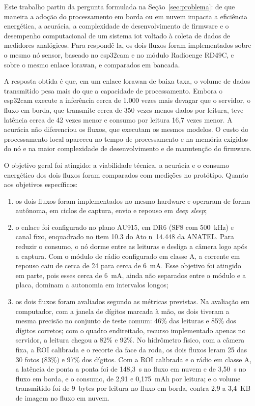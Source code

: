 Este trabalho partiu da pergunta formulada na Seção~\ref{sec:problema}: de que maneira a
adoção do processamento em borda ou em nuvem impacta a eficiência energética, a acurácia, a
complexidade de desenvolvimento de firmware e o desempenho computacional de um sistema
\gls{iot} voltado à coleta de dados de medidores analógicos. Para respondê-la, os dois
fluxos foram implementados sobre o mesmo nó sensor, baseado no \gls{esp32cam} e no módulo
Radioenge RD49C, e sobre o mesmo enlace \gls{lorawan}, e comparados em bancada.

A resposta obtida é que, em um enlace \gls{lorawan} de baixa taxa, o volume de dados
transmitido pesa mais do que a capacidade de processamento. Embora o \gls{esp32cam} execute a
inferência cerca de 1.000 vezes mais devagar que o servidor, o fluxo em borda, que transmite
cerca de 350 vezes menos dados por leitura, teve latência cerca de 42 vezes menor e consumo
por leitura 16,7 vezes menor. A acurácia não diferenciou os fluxos, que executam
os mesmos modelos. O custo do processamento local apareceu no tempo de processamento e na
memória exigidos do nó e na maior complexidade de desenvolvimento e de manutenção do
firmware.

O objetivo geral foi atingido: a viabilidade técnica, a acurácia e o consumo energético dos
dois fluxos foram comparados com medições no protótipo. Quanto aos objetivos específicos:

\begin{enumerate}
    \item os dois fluxos foram implementados no mesmo hardware e operaram de forma autônoma,
    em ciclos de captura, envio e repouso em \textit{deep sleep};
    \item o enlace foi configurado no plano AU915, em DR6 (SF8 com 500~kHz) e canal fixo,
    enquadrado no item 10.3 do Ato n\textordmasculine~14.448 da ANATEL. Para reduzir o
    consumo, o nó dorme entre as leituras e desliga a câmera logo após a captura. Com o
    módulo de rádio configurado
    em classe A, a corrente em repouso caiu de cerca de 24 para cerca de 6~mA. Esse objetivo
    foi atingido em parte, pois esses cerca de 6~mA, ainda não separados entre o módulo e a
    placa, dominam a autonomia em intervalos longos;
    \item os dois fluxos foram avaliados segundo as métricas previstas. Na avaliação em
    computador, com a janela de dígitos marcada à mão, os dois tiveram a mesma precisão no
    conjunto de teste comum: 46\% das leituras e 85\% dos dígitos corretos; com o quadro
    endireitado, recurso implementado apenas no servidor, a leitura chegou a 82\% e 92\%. No
    hidrômetro físico, com a câmera fixa, a ROI calibrada e o recorte da face da roda, os dois
    fluxos leram 25 das 30 fotos (83\%) e 97\% dos dígitos. Com a ROI calibrada e o rádio em
    classe A, a latência de ponta a ponta foi de 148,3~s no fluxo em nuvem e de 3,50~s no
    fluxo em borda, e o consumo, de 2,91 e 0,175~mAh por leitura; e o volume
    transmitido foi de 9~bytes por leitura no fluxo em borda, contra 2,9 a 3,4~KB de imagem
    no fluxo em nuvem.
\end{enumerate}

